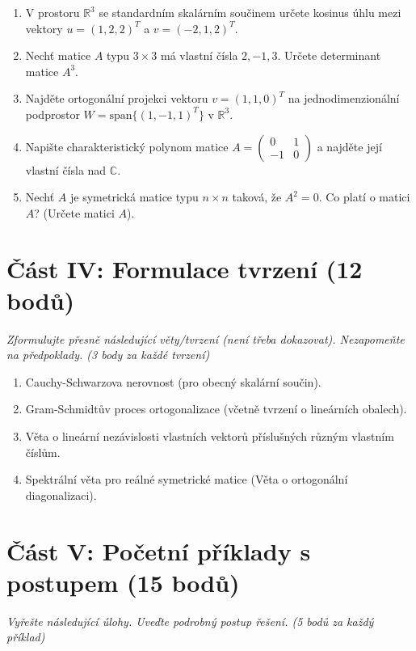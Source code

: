 \documentclass[a4paper,11pt]{article}
\begin{document}
\begin{enumerate}
    \item V prostoru $\mathbb{R}^3$ se standardním skalárním součinem určete kosinus úhlu mezi vektory $u = (1, 2, 2)^T$ a $v = (-2, 1, 2)^T$.
    \item Nechť matice $A$ typu $3 \times 3$ má vlastní čísla $2, -1, 3$. Určete determinant matice $A^3$.
    \item Najděte ortogonální projekci vektoru $v = (1, 1, 0)^T$ na jednodimenzionální podprostor $W = \text{span}\{(1, -1, 1)^T\}$ v $\mathbb{R}^3$.
    \item Napište charakteristický polynom matice $A = \begin{pmatrix} 0 & 1 \\ -1 & 0 \end{pmatrix}$ a najděte její vlastní čísla nad $\mathbb{C}$.
    \item Nechť $A$ je symetrická matice typu $n \times n$ taková, že $A^2 = 0$. Co platí o matici $A$? (Určete matici $A$).
\end{enumerate}

\vspace{0.5cm}

\section*{Část IV: Formulace tvrzení (12 bodů)}
\textit{Zformulujte přesně následující věty/tvrzení (není třeba dokazovat). Nezapomeňte na předpoklady. (3 body za každé tvrzení)}

\begin{enumerate}
    \item Cauchy-Schwarzova nerovnost (pro obecný skalární součin).
    \item Gram-Schmidtův proces ortogonalizace (včetně tvrzení o lineárních obalech).
    \item Věta o lineární nezávislosti vlastních vektorů příslušných různým vlastním číslům.
    \item Spektrální věta pro reálné symetrické matice (Věta o ortogonální diagonalizaci).
\end{enumerate}

\newpage

\section*{Část V: Početní příklady s postupem (15 bodů)}
\textit{Vyřešte následující úlohy. Uveďte podrobný postup řešení. (5 bodů za každý příklad)}
\end{document}
